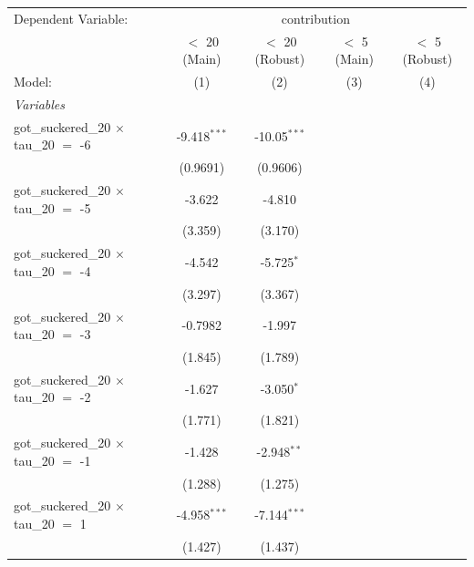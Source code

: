 
\begingroup
\centering
\begin{tabular}{lcccc}
   \tabularnewline \midrule \midrule
   Dependent Variable: & \multicolumn{4}{c}{contribution}\\
                                                 & $<$ 20 (Main)  & $<$ 20 (Robust) & $<$ 5 (Main)   & $<$ 5 (Robust) \\   
   Model:                                        & (1)            & (2)             & (3)            & (4)\\  
   \midrule
   \emph{Variables}\\
   got\_suckered\_20 $\times$ tau\_20 $=$ -6     & -9.418$^{***}$ & -10.05$^{***}$  &                &   \\   
                                                 & (0.9691)       & (0.9606)        &                &   \\   
   got\_suckered\_20 $\times$ tau\_20 $=$ -5     & -3.622         & -4.810          &                &   \\   
                                                 & (3.359)        & (3.170)         &                &   \\   
   got\_suckered\_20 $\times$ tau\_20 $=$ -4     & -4.542         & -5.725$^{*}$    &                &   \\   
                                                 & (3.297)        & (3.367)         &                &   \\   
   got\_suckered\_20 $\times$ tau\_20 $=$ -3     & -0.7982        & -1.997          &                &   \\   
                                                 & (1.845)        & (1.789)         &                &   \\   
   got\_suckered\_20 $\times$ tau\_20 $=$ -2     & -1.627         & -3.050$^{*}$    &                &   \\   
                                                 & (1.771)        & (1.821)         &                &   \\   
   got\_suckered\_20 $\times$ tau\_20 $=$ -1     & -1.428         & -2.948$^{**}$   &                &   \\   
                                                 & (1.288)        & (1.275)         &                &   \\   
   got\_suckered\_20 $\times$ tau\_20 $=$ 1      & -4.958$^{***}$ & -7.144$^{***}$  &                &   \\   
                                                 & (1.427)        & (1.437)         &                &   \\   

\end{tabular}
